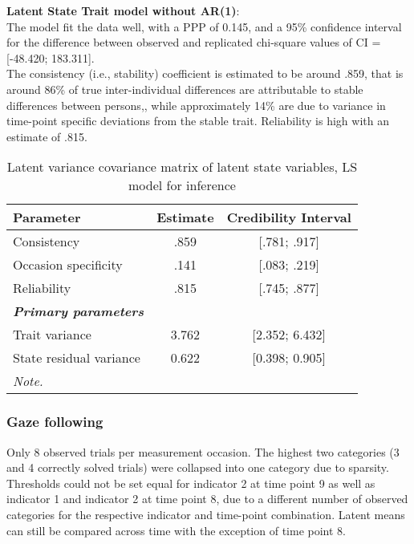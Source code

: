   \textbf{Latent State Trait model without AR(1)}: \\
The model fit the data well, with a PPP of 0.145, and a 95\% confidence interval for the difference between observed and replicated chi-square values of CI = [-48.420; 183.311]. \\

The consistency (i.e., stability) coefficient is estimated to be around .859, that is around 86\% of true inter-individual differences are attributable to stable differences between persons,, while approximately 14\% are due to variance in time-point specific deviations from the stable trait. Reliability is high with an estimate of .815.


\begin{table}[H]
 \setlength{\tabcolsep}{1mm}
 \begin{center}
        \caption[Correlation latent State inference]{Latent variance covariance matrix of latent state variables, LS model for inference}
        \label{Tab: correlations LS inference}
            {\footnotesize
            \begin{tabular}{lcc}
            \hline         
          Parameter & Estimate & Credibility Interval\\
         \hline 
           Consistency & .859 &[.781; .917] \\
           Occasion specificity & .141&[.083; .219] \\
           Reliability &.815& [.745; .877] \\
            \textbf{\textit{Primary parameters}} & & \\
            Trait variance & 3.762& [2.352; 6.432] \\
             State residual variance & 0.622 & [0.398; 0.905] \\
 \hline 
\multicolumn{3}{p{0.4\textwidth}}{\scriptsize{\textit{Note.}}} \\
            \end{tabular}}
        \end{center}
        \end{table}

\subsubsection{Gaze following}

Only 8 observed trials per measurement occasion. The highest two categories (3 and 4 correctly solved trials) were collapsed into one category due to sparsity. 
Thresholds could not be set equal for indicator 2 at time point 9 as well as indicator 1 and indicator 2 at time point 8, due to a different number of observed categories for the respective indicator and time-point combination. Latent means can still be compared across time with the exception of time point 8. \\

